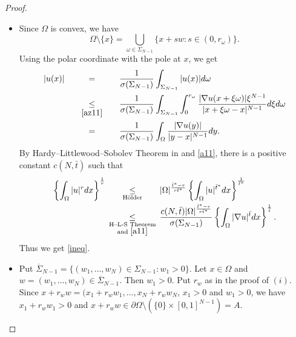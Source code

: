 \documentclass[11pt, a4paper]{article}
\numberwithin{equation}{section}
\newcommand{\coex}[2][\hphantom{longexplanation}]{%
  \underset{{#1}}{\overset{\hphantom{longexplanation}}{#2}}
}
\begin{document}
\begin{proof}
\begin{itemize}[wide]
\item[$(i)$] Since $\Omega$ is convex, we have
 \[\Omega\setminus \{x\}= \bigcup_{\omega\in\Sigma_{N-1}}\{x+sw: s\in
   (0,r_{\omega})\}.\]
 Using the polar coordinate with the pole at $x$, we get 
 \begin{align}
   \label{a11}
   \begin{split}
     |u(x)|
     &\coex{=}\frac{1}{\sigma(\Sigma_{N-1})}\int_{\Sigma_{N-1}}|u(x)|d\omega\\ &\coex[\eqref{az11}]{\le}\frac{1}{\sigma(\Sigma_{N-1})}\int_{\Sigma_{N-1}}\int_{0}^{r_{\omega}}\frac{|\nabla
     u(x+\xi\omega)|\xi^{N-1}}{|x+\xi\omega -x|^{N-1}}d\xi
                                                                          d\omega\\
     &\coex{=}\frac{1}{\sigma(\Sigma_{N-1})}\int_{\Omega}\frac{|\nabla
     u(y)|}{|y -x|^{N-1}}dy.
   \end{split}
\end{align}
By Hardy–Littlewood–Sobolev Theorem in \cite[p.35]{linaresIntroductionNonlinearDispersive2015} and \eqref{a11}, there is a positive constant $c(N,\bar{t})$ such that
\begin{align*}
\left\{\int_{\Omega}
  |u|^{r}dx\right\}^{\frac{1}{r}}
  &\coex[\text{H\"{o}lder}]{\le}
  |\Omega|^{\frac{\bar{t}^{\ast}-r}{r\bar{t}^{\ast}}} \left\{\int_{\Omega}
    |u|^{\bar{t}^{\ast}}dx\right\}^{\frac{1}{\bar{t}^{\ast}}}\\
  &\coex[\substack{\text{H–L-S Theorem}\\ \text{and } \eqref{a11}}]{\le} \frac{c(N,\bar{t})|\Omega|^{\frac{\bar{t}^{\ast}-r}{r\bar{t}^{\ast}}} }{\sigma(\Sigma_{N-1})}\left\{\int_{\Omega} |\nabla u|^{\bar{t}}dx\right\}^{\frac{1}{\bar{t}}}.
\end{align*}
Thus  we get \eqref{ineq}.
\item[$(ii)$]   Put $\overline{\Sigma}_{N-1} =\{(w_{1},\ldots,w_{N})\in \Sigma_{N-1}: w_{1}>0\}$. Let $x\in \Omega$ and $w= (w_{1},\ldots, w_{N})
    \in \overline{\Sigma}_{N-1}$. Then $w_{1}>0$. Put $r_{w}$ as in
    the proof of $(i)$. Since $x+r_{w}w= (x_{1}+r_{w}w_{1},\ldots,
    x_{N}+r_{w}w_{N}$, $x_{1}>0$ and $w_{1}>0$, we have
    $x_{1}+r_{w}w_{1}>0$ and  $x+r_{w}w\in \partial\Omega \setminus
    (\{0\}\times[0,1]^{N-1})=A$.
    

\end{itemize}
\end{proof}
\end{document}

